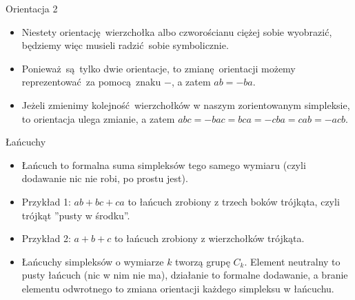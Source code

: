 \documentclass{beamer}
\begin{document}
\begin{frame}{Orientacja 2}
\begin{itemize}
	\item Niestety orientację wierzchołka albo czworościanu ciężej sobie wyobrazić, będziemy więc musieli radzić sobie symbolicznie.
	\item Ponieważ są tylko dwie orientacje, to zmianę orientacji możemy reprezentować za pomocą znaku $-$, a zatem $ab = -ba$.
	\item Jeżeli zmienimy kolejność wierzchołków w naszym zorientowanym simpleksie, to orientacja ulega zmianie, a zatem $abc = -bac = bca = -cba = cab = -acb$.
\end{itemize}
\end{frame}

\begin{frame}{Łańcuchy}

\begin{itemize}
	\item Łańcuch to formalna suma simpleksów tego samego wymiaru (czyli dodawanie nic nie robi, po prostu jest).
	\item Przykład 1: $ab + bc + ca$ to łańcuch zrobiony z trzech boków trójkąta, czyli trójkąt ''pusty w środku''.
	\item Przykład 2: $a + b + c$ to łańcuch zrobiony z wierzchołków trójkąta. 
	\item Łańcuchy simpleksów o wymiarze $k$ tworzą grupę $C_k$. Element neutralny to pusty łańcuch (nic w nim nie ma), działanie to formalne dodawanie, a branie elementu odwrotnego to zmiana orientacji każdego simpleksu w łańcuchu.
\end{itemize}

\end{frame}
\end{document}
